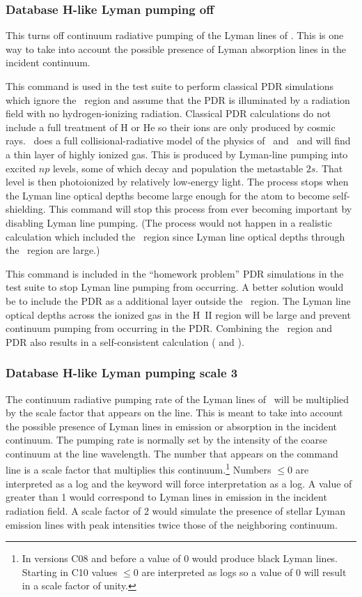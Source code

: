 \subsubsection{Database H-like Lyman pumping off}  
This turns off continuum radiative pumping of the Lyman lines of \hi.
This is one way to take into account the possible
presence of Lyman absorption lines in the incident continuum.

This command is used in the test suite to perform classical PDR
simulations which ignore the \hplus\ region and assume that the PDR is
illuminated by a radiation field with no hydrogen-ionizing radiation.
Classical PDR calculations do not include a full treatment of H or He so
their ions are only produced by cosmic rays.
\Cloudy\ does a full collisional-radiative model
of the physics of \hO\ and \heO\
and will find a thin layer of highly ionized
gas.
This is produced by Lyman-line pumping into excited $np$ levels, some of which decay and
population the metastable $2s$.
That level is then photoionized by relatively low-energy light.
The process stops when the Lyman line optical depths become large enough
for the atom to become self-shielding.
This command will stop this
process from ever becoming important by disabling Lyman line pumping.
(The process would not happen in a realistic calculation
which included the \hplus\ region since Lyman line optical depths
through the \hplus\ region are large.)

This command is included in the ``homework problem'' PDR simulations
in the test suite to
stop Lyman line pumping from occurring.
A better solution would be to include
the PDR as a additional layer outside the \hplus\ region.
The Lyman line
optical depths across the ionized gas in the H~II region will be large and prevent continuum
pumping from occurring in the PDR.
Combining the \hii\ region and PDR also
results in a self-consistent calculation
(\citealp{Abel2005} and \citealp{Abel2008} ).

\subsubsection{Database H-like Lyman pumping scale 3}
The continuum radiative pumping rate
of the Lyman lines of \hi\ will be multiplied by the scale factor
that appears on the line.
This is meant to take into account the possible presence of
Lyman lines in emission or absorption in the incident continuum.
The pumping
rate is normally set by the intensity of the coarse continuum at the line
wavelength.
The number that appears on the command line is a scale factor
that multiplies this continuum.\footnote{In versions C08 and before a value of 0 would produce black Lyman lines.
Starting in C10 values $\le 0$ are interpreted as logs
so a value of 0 will result in a scale factor of unity.}
Numbers $\le 0$ are interpreted as a log and
the  keyword will force interpretation as a log.
A value of greater than 1 would correspond to Lyman lines
in emission in the incident radiation field.
A scale factor of 
2 would simulate the presence of stellar Lyman emission lines with peak
intensities twice those of the neighboring continuum.

